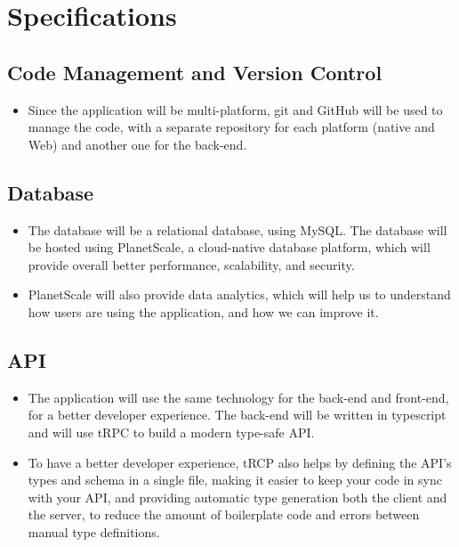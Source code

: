 \section{Specifications}

\subsection{Code Management and Version Control}
\begin{itemize}
  \item Since the application will be multi-platform, git and GitHub will be used to manage the code, with a separate repository for each platform (native and Web) and another one for the back-end.
\end{itemize}

\subsection{Database}
\begin{itemize}
  \item The database will be a relational database, using MySQL. The database will be hosted using PlanetScale, a cloud-native database platform, which will provide overall better performance, scalability, and security.
  \item PlanetScale will also provide data analytics, which will help us to understand how users are using the application, and how we can improve it.
\end{itemize}

\subsection{API}
\begin{itemize}
  \item The application will use the same technology for the back-end and front-end, for a better developer experience. The back-end will be written in typescript and will use tRPC to build a modern type-safe API.
  \item To have a better developer experience, tRCP also helps by defining the API's types and schema in a single file, making it easier to keep your code in sync with your API, and providing automatic type generation both the client and the server, to reduce the amount of boilerplate code and errors between manual type definitions.
\end{itemize}

